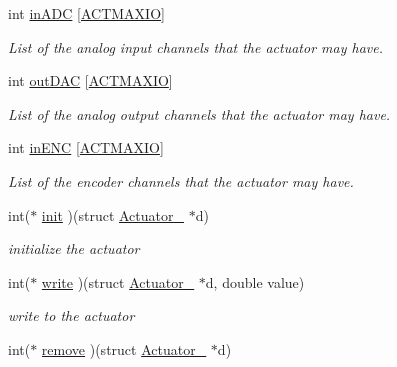 \begin{DoxyCompactItemize}
\mbox{\label{struct_actuator___ae7e668c591eb457d5796ca4bf3c26fbc}} 
int \hyperlink{struct_actuator___ae7e668c591eb457d5796ca4bf3c26fbc}{in\+A\+DC} \mbox{[}\hyperlink{_actuator_8h_a124e6cd28aabeb095341daaabdef7363}{A\+C\+T\+M\+A\+X\+IO}\mbox{]}
\begin{DoxyCompactList}\small\item\em List of the analog input channels that the actuator may have. \end{DoxyCompactList}\item 
\mbox{\label{struct_actuator___ae80c165d98fce674f284b635c4604543}} 
int \hyperlink{struct_actuator___ae80c165d98fce674f284b635c4604543}{out\+D\+AC} \mbox{[}\hyperlink{_actuator_8h_a124e6cd28aabeb095341daaabdef7363}{A\+C\+T\+M\+A\+X\+IO}\mbox{]}
\begin{DoxyCompactList}\small\item\em List of the analog output channels that the actuator may have. \end{DoxyCompactList}\item 
\mbox{\label{struct_actuator___a8cdde68e966d1cebb70e94d420e50114}} 
int \hyperlink{struct_actuator___a8cdde68e966d1cebb70e94d420e50114}{in\+E\+NC} \mbox{[}\hyperlink{_actuator_8h_a124e6cd28aabeb095341daaabdef7363}{A\+C\+T\+M\+A\+X\+IO}\mbox{]}
\begin{DoxyCompactList}\small\item\em List of the encoder channels that the actuator may have. \end{DoxyCompactList}\item 
int($\ast$ \hyperlink{struct_actuator___a9dd4cdb3284c8509f72af4f4d2b316b0}{init} )(struct \hyperlink{struct_actuator__}{Actuator\+\_\+} $\ast$d)
\begin{DoxyCompactList}\small\item\em initialize the actuator \end{DoxyCompactList}\item 
int($\ast$ \hyperlink{struct_actuator___a4180113a8996ba8269ecdc5b9b5b3baa}{write} )(struct \hyperlink{struct_actuator__}{Actuator\+\_\+} $\ast$d, double value)
\begin{DoxyCompactList}\small\item\em write to the actuator \end{DoxyCompactList}\item 
int($\ast$ \hyperlink{struct_actuator___ad5d2e19e23d4d49b2b5df2d2e0a0755d}{remove} )(struct \hyperlink{struct_actuator__}{Actuator\+\_\+} $\ast$d)

\end{DoxyCompactItemize}

